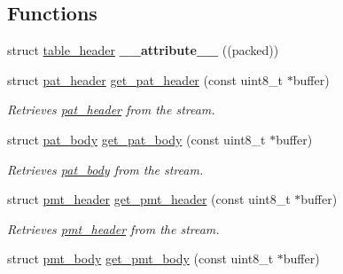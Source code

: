 \subsection*{Functions}
\begin{DoxyCompactItemize}
\item 
struct \hyperlink{structtable__header}{table\+\_\+header} {\bfseries \+\_\+\+\_\+attribute\+\_\+\+\_\+} ((packed))\hypertarget{group__structure_ga510c41bef1974f6149a916faf7ff1d92}{}\label{group__structure_ga510c41bef1974f6149a916faf7ff1d92}

\item 
struct \hyperlink{structpat__header}{pat\+\_\+header} \hyperlink{group__structure_ga251eb9b1a59ade4a6230b32bdb6d83b1}{get\+\_\+pat\+\_\+header} (const uint8\+\_\+t $\ast$buffer)\hypertarget{group__structure_ga251eb9b1a59ade4a6230b32bdb6d83b1}{}\label{group__structure_ga251eb9b1a59ade4a6230b32bdb6d83b1}

\begin{DoxyCompactList}\small\item\em Retrieves \hyperlink{structpat__header}{pat\+\_\+header} from the stream. \end{DoxyCompactList}\item 
struct \hyperlink{structpat__body}{pat\+\_\+body} \hyperlink{group__structure_gac40b4dc77494cdc5b83144784224ad4a}{get\+\_\+pat\+\_\+body} (const uint8\+\_\+t $\ast$buffer)\hypertarget{group__structure_gac40b4dc77494cdc5b83144784224ad4a}{}\label{group__structure_gac40b4dc77494cdc5b83144784224ad4a}

\begin{DoxyCompactList}\small\item\em Retrieves \hyperlink{structpat__body}{pat\+\_\+body} from the stream. \end{DoxyCompactList}\item 
struct \hyperlink{structpmt__header}{pmt\+\_\+header} \hyperlink{group__structure_gaf0918f359410beb3897aee11d8bf1334}{get\+\_\+pmt\+\_\+header} (const uint8\+\_\+t $\ast$buffer)\hypertarget{group__structure_gaf0918f359410beb3897aee11d8bf1334}{}\label{group__structure_gaf0918f359410beb3897aee11d8bf1334}

\begin{DoxyCompactList}\small\item\em Retrieves \hyperlink{structpmt__header}{pmt\+\_\+header} from the stream. \end{DoxyCompactList}\item 
struct \hyperlink{structpmt__body}{pmt\+\_\+body} \hyperlink{group__structure_gae658cd1a590981159afcdd22a715837f}{get\+\_\+pmt\+\_\+body} (const uint8\+\_\+t $\ast$buffer)\hypertarget{group__structure_gae658cd1a590981159afcdd22a715837f}{}\label{group__structure_gae658cd1a590981159afcdd22a715837f}


\end{DoxyCompactItemize}

